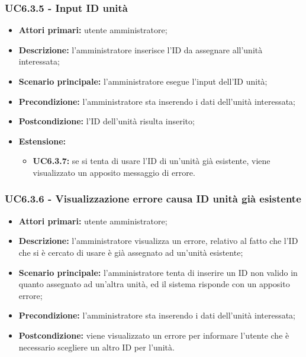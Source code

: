 \subsubsection{UC6.3.5 - Input ID unità}
	\begin{itemize}
		\item \textbf{Attori primari:} utente amministratore;
		\item \textbf{Descrizione:} l'amministratore inserisce l'ID da assegnare all'unità interessata;
		\item \textbf{Scenario principale:} l'amministratore esegue l'input dell'ID unità;
		\item \textbf{Precondizione:} l'amministratore sta inserendo i dati dell'unità interessata;
		\item \textbf{Postcondizione:} l'ID dell'unità risulta inserito;
		\item \textbf{Estensione:}
		\begin{itemize}
			\item \textbf{UC6.3.7:} se si tenta di usare l'ID di un'unità già esistente, viene visualizzato un apposito messaggio di errore.
		\end{itemize}
	\end{itemize}

\subsubsection{UC6.3.6 - Visualizzazione errore causa ID unità già esistente}
	\begin{itemize}
		\item \textbf{Attori primari:} utente amministratore;
		\item \textbf{Descrizione:} l'amministratore visualizza un errore, relativo al fatto che l'ID che si è cercato di usare è già assegnato ad un'unità esistente;
		\item \textbf{Scenario principale:} l'amministratore tenta di inserire un ID non valido in quanto assegnato ad un'altra unità, ed il sistema risponde con un apposito errore;
		\item \textbf{Precondizione:} l'amministratore sta inserendo i dati dell'unità interessata;
		\item \textbf{Postcondizione:} viene visualizzato un errore per informare l'utente che è necessario scegliere un altro ID per l'unità.
	\end{itemize}